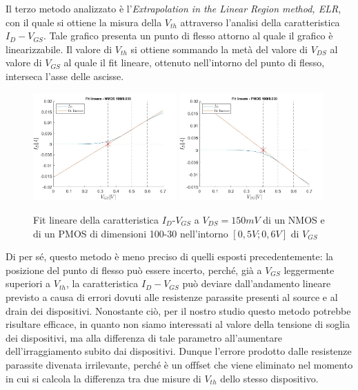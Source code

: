 \documentclass[12pt, letterpaper]{book}
\begin{document}
Il terzo metodo analizzato è l'\emph{Extrapolation in the Linear Region method, ELR}, con il quale si ottiene la misura della $V_{th}$ attraverso l'analisi della caratteristica $I_D-V_{GS}$.  Tale grafico presenta un punto di flesso attorno al quale il grafico è linearizzabile. Il valore di $V_{th}$ si ottiene sommando la metà del valore di $V_{DS}$ al valore di $V_{GS}$ al quale il fit lineare, ottenuto nell'intorno del punto di flesso, interseca l'asse delle ascisse.\\


\begin{figure}[h!]
  \centering
  \includegraphics[width=0.49\textwidth]{LinearFit-N4-100-30}
  \includegraphics[width=0.49\textwidth]{LinearFit-P1-100-30}
  \caption{Fit lineare della caratteristica  $I_D$-$V_{GS}$ a $V_{DS}=150mV$ di un NMOS e di un PMOS di dimensioni 100-30 nell'intorno $[0,5V ; 0,6V]$ di $V_{GS}$}
\end{figure}

Di per sé, questo metodo è meno preciso di quelli esposti precedentemente: la posizione del punto di flesso può essere incerto, perché, già a $V_{GS}$ leggermente superiori a $V_{th}$, la caratteristica $I_D-V_{GS}$ può deviare dall'andamento lineare previsto a causa di errori dovuti alle resistenze parassite presenti al source e al drain dei dispositivi.
Nonostante ciò, per il nostro studio questo metodo potrebbe risultare efficace, in quanto non siamo interessati al valore della tensione di soglia dei dispositivi, ma alla differenza di tale parametro all'aumentare dell'irraggiamento subito dai dispositivi. Dunque l'errore prodotto dalle resistenze parassite divenata irrilevante, perché è un offfset che viene eliminato nel momento in cui si calcola la differenza tra due misure di $V_{th}$ dello stesso dispositivo.
\end{document}
